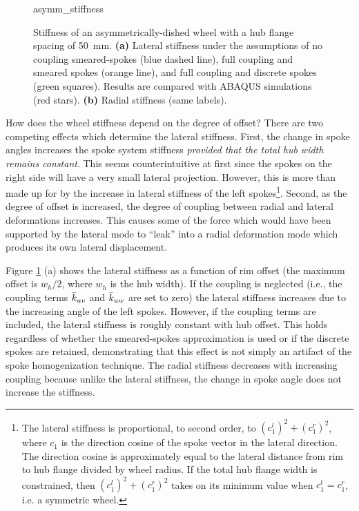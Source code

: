 \documentclass[\rootdir/thesis.tex]{subfiles}
\begin{document}
\begin{figure}[t]
\centering
{asymm_stiffness}
\caption{Stiffness of an asymmetrically-dished wheel with a hub flange spacing of \SI{50}{mm}. \textbf{(a)} Lateral stiffness under the assumptions of no coupling smeared-spokes (blue dashed line), full coupling and smeared spokes (orange line), and full coupling and discrete spokes (green squares). Results are compared with ABAQUS simulations (red stars). \textbf{(b)} Radial stiffness (same labels).}
\label{fig:asymm_wheel}
\end{figure}

How does the wheel stiffness depend on the degree of offset? There are two competing effects which determine the lateral stiffness. First, the change in spoke angles increases the spoke system stiffness \emph{provided that the total hub width remains constant}. This seems counterintuitive at first since the spokes on the right side will have a very small lateral projection. However, this is more than made up for by the increase in lateral stiffness of the left spokes\footnote{The lateral stiffness is proportional, to second order, to $(c_1^l)^2 + (c_1^r)^2$, where $c_1$ is the direction cosine of the spoke vector in the lateral direction. The direction cosine is approximately equal to the lateral distance from rim to hub flange divided by wheel radius. If the total hub flange width is constrained, then $(c_1^l)^2 + (c_1^r)^2$ takes on its minimum value when $c_1^l = c_1^r$, i.e. a symmetric wheel.}. Second, as the degree of offset is increased, the degree of coupling between radial and lateral deformations increases. This causes some of the force which would have been supported by the lateral mode to ``leak'' into a radial deformation mode which produces its own lateral displacement.

Figure \ref{fig:asymm_wheel} (a) shows the lateral stiffness as a function of rim offset (the maximum offset is $w_h/2$, where $w_h$ is the hub width). If the coupling is neglected (i.e., the coupling terms $\bar{k}_{uv}$ and $\bar{k}_{uw}$ are set to zero) the lateral stiffness increases due to the increasing angle of the left spokes. However, if the coupling terms are included, the lateral stiffness is roughly constant with hub offset. This holds regardless of whether the smeared-spokes approximation is used or if the discrete spokes are retained, demonstrating that this effect is not simply an artifact of the spoke homogenization technique. The radial stiffness decreases with increasing coupling because unlike the lateral stiffness, the change in spoke angle does not increase the stiffness.
\end{document}

